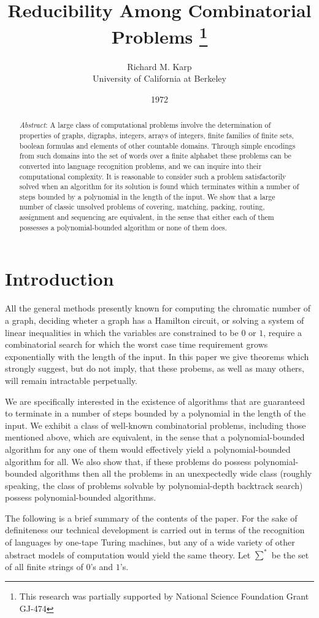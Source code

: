 \documentclass{scrartcl}
\title{Reducibility Among Combinatorial Problems \thanks{This research was partially supported by National Science Foundation Grant GJ-474}}
\author{Richard M. Karp \\ University of California at Berkeley}
\date{1972}
\begin{document}
\maketitle

\begin{abstract}
\emph{Abstract}: A large class of computational problems involve the determination of properties of graphs, digraphs, integers, arrays of integers, finite families of finite sets, boolean formulas and elements of other countable domains.
Through simple encodings from such domains into the set of words over a finite alphabet these problems can be converted into language recognition problems, and we can inquire into their computational complexity.
It is reasonable to consider such a problem satisfactorily solved when an algorithm for its solution is found which terminates within a number of steps bounded by a polynomial in the length of the input.
We show that a large number of classic unsolved problems of covering, matching, packing, routing, assignment and sequencing are equivalent, in the sense that either each of them possesses a polynomial-bounded algorithm or none of them does.
\end{abstract}

\section{Introduction}
All the general methods presently known for computing the chromatic number of a graph, deciding wheter a graph has a Hamilton circuit, or solving a system of linear inequalities in which the variables are constrained to be \(0\) or \(1\), require a combinatorial search for which the worst case time requirement grows exponentially with the length of the input.
In this paper we give theorems which strongly suggest, but do not imply, that these probems, as well as many others, will remain intractable perpetually.

We are specifically interested in the existence of algorithms that are guaranteed to terminate in a number of steps bounded by a polynomial in the length of the input.
We exhibit a class of well-known combinatorial problems, including those mentioned above, which are equivalent, in the sense that a polynomial-bounded algorithm for any one of them would effectively yield a polynomial-bounded algorithm for all.
We also show that, if these problems do possess polynomial-bounded algorithms then all the problems in an unexpectedly  wide class (roughly speaking, the class of problems solvable by polynomial-depth backtrack search) possess polynomial-bounded algorithms.

The following is a brief summary of the contents of the paper.
For the sake of definiteness our technical development is carried out in terms of the recognition of languages by one-tape Turing machines, but any of a wide variety of other abstract models of computation would yield the same theory.
Let \(\sum^{*}\) be the set of all finite strings of \(0\)'s and \(1\)'s.
\end{document}
